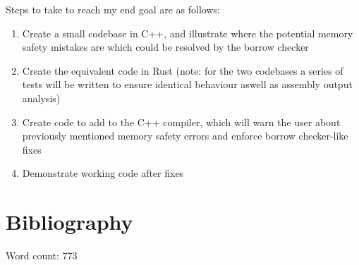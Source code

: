 \documentclass{article}
\begin{document}
Steps to take to reach my end goal are as follows:
\begin{enumerate}
	\item{Create a small codebase in C++, and illustrate where the potential memory safety mistakes are which could be resolved by the borrow checker}
	\item{Create the equivalent code in Rust (note: for the two codebases a series of tests will be written to ensure identical behaviour aswell as assembly output analysis)}
	\item{Create code to add to the C++ compiler, which will warn the user about previously mentioned memory safety errors and enforce borrow checker-like fixes}
	\item{Demonstrate working code after fixes}
\end{enumerate}

\section{Bibliography}
\printbibliography[heading=none]

Word count: 773
\end{document}
